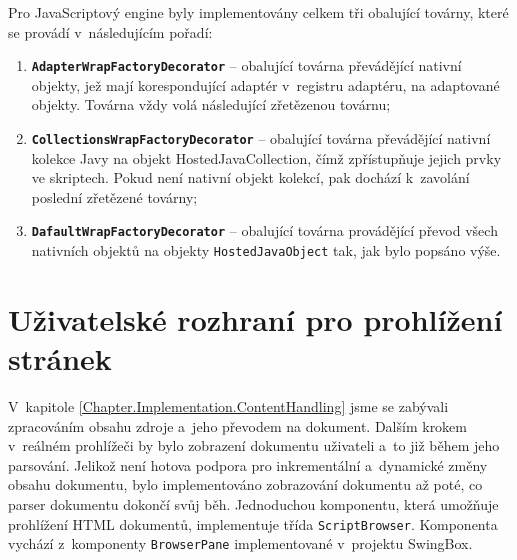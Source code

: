 Pro JavaScriptový engine byly implementovány celkem tři obalující továrny, které se provádí v~následujícím pořadí:

\begin{enumerate}
  \item \textbf{\texttt{AdapterWrapFactoryDecorator}} -- obalující továrna převádějící nativní objekty, jež mají korespondující adaptér v~registru adaptéru, na adaptované objekty. Továrna vždy volá následující zřetězenou továrnu;
  \item \textbf{\texttt{CollectionsWrapFactoryDecorator}} -- obalující továrna převádějící nativní kolekce Javy na objekt HostedJavaCollection, čímž zpřístupňuje jejich prvky ve skriptech. Pokud není nativní objekt kolekcí, pak dochází k~zavolání poslední zřetězené továrny;
  \item \textbf{\texttt{DafaultWrapFactoryDecorator}} -- obalující továrna provádějící převod všech nativních objektů na objekty \texttt{HostedJavaObject} tak, jak bylo popsáno výše.
\end{enumerate}

\section{Uživatelské rozhraní pro prohlížení stránek}
\label{Chapter.Implementation.UserInterface}

V~kapitole \ref{Chapter.Implementation.ContentHandling} jsme se zabývali zpracováním obsahu zdroje a~jeho převodem na dokument. Dalším krokem v~reálném prohlížeči by bylo zobrazení dokumentu uživateli a~to již během jeho parsování. Jelikož není hotova podpora pro inkrementální a~dynamické změny obsahu dokumentu, bylo implementováno zobrazování dokumentu až poté, co parser dokumentu dokončí svůj běh. Jednoduchou komponentu, která umožňuje prohlížení HTML dokumentů, implementuje třída \texttt{ScriptBrowser}. Komponenta vychází z~komponenty \texttt{BrowserPane} implementované v~projektu SwingBox.

